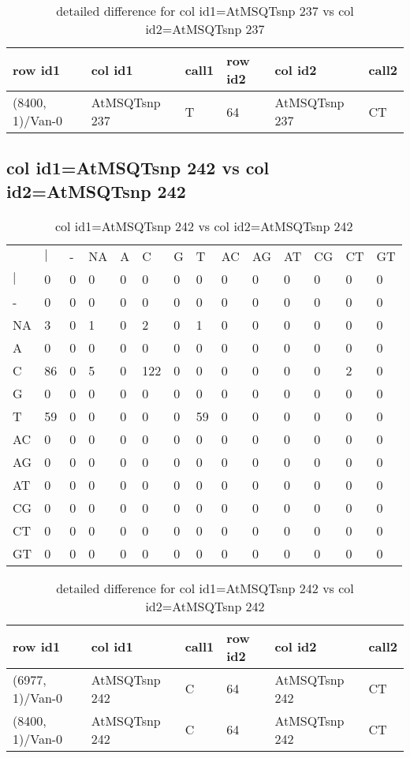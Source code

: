\begin{center}
\begin{longtable}{|l|l|l|l|l|l|}
\caption{detailed difference for col id1=AtMSQTsnp 237 vs col id2=AtMSQTsnp 237} \label{table_dm791}\\
\hline
row id1&col id1&call1&row id2&col id2&call2\\
\hline
(8400, 1)/Van-0&AtMSQTsnp 237&T&64&AtMSQTsnp 237&CT\\
\hline
\end{longtable}
\end{center}

\subsection{col id1=AtMSQTsnp 242 vs col id2=AtMSQTsnp 242}
\begin{center}
\begin{longtable}{|l|l|l|l|l|l|l|l|l|l|l|l|l|l|}
\caption{col id1=AtMSQTsnp 242 vs col id2=AtMSQTsnp 242} \label{table_dm792}\\
\hline
\\
\hline
&$|$&-&NA&A&C&G&T&AC&AG&AT&CG&CT&GT\\
$|$&0&0&0&0&0&0&0&0&0&0&0&0&0\\
-&0&0&0&0&0&0&0&0&0&0&0&0&0\\
NA&3&0&1&0&2&0&1&0&0&0&0&0&0\\
A&0&0&0&0&0&0&0&0&0&0&0&0&0\\
C&86&0&5&0&122&0&0&0&0&0&0&2&0\\
G&0&0&0&0&0&0&0&0&0&0&0&0&0\\
T&59&0&0&0&0&0&59&0&0&0&0&0&0\\
AC&0&0&0&0&0&0&0&0&0&0&0&0&0\\
AG&0&0&0&0&0&0&0&0&0&0&0&0&0\\
AT&0&0&0&0&0&0&0&0&0&0&0&0&0\\
CG&0&0&0&0&0&0&0&0&0&0&0&0&0\\
CT&0&0&0&0&0&0&0&0&0&0&0&0&0\\
GT&0&0&0&0&0&0&0&0&0&0&0&0&0\\
\hline
\end{longtable}
\end{center}

\begin{center}
\begin{longtable}{|l|l|l|l|l|l|}
\caption{detailed difference for col id1=AtMSQTsnp 242 vs col id2=AtMSQTsnp 242} \label{table_dm793}\\
\hline
row id1&col id1&call1&row id2&col id2&call2\\
\hline
(6977, 1)/Van-0&AtMSQTsnp 242&C&64&AtMSQTsnp 242&CT\\
(8400, 1)/Van-0&AtMSQTsnp 242&C&64&AtMSQTsnp 242&CT\\
\hline
\end{longtable}
\end{center}

